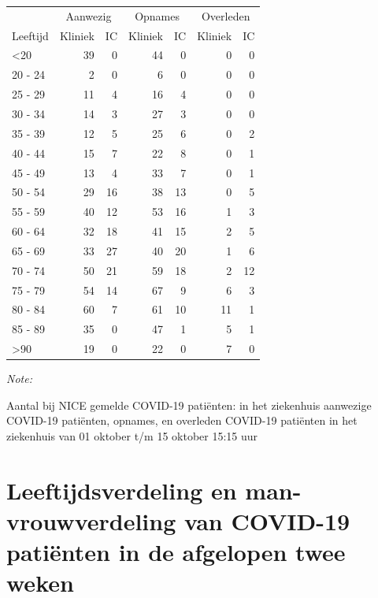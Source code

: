 \documentclass[
  english,
  man,floatsintext]{apa6}
\begin{document}
\begin{table}
\centering\begingroup\fontsize{10}{12}\selectfont

\begin{threeparttable}
\begin{tabular}{lrrrrrr}
\toprule
\multicolumn{1}{c}{ } & \multicolumn{2}{c}{Aanwezig} & \multicolumn{2}{c}{Opnames} & \multicolumn{2}{c}{Overleden} \\
\cmidrule(l{3pt}r{3pt}){2-3} \cmidrule(l{3pt}r{3pt}){4-5} \cmidrule(l{3pt}r{3pt}){6-7}
Leeftijd & Kliniek & IC & Kliniek & IC & Kliniek & IC\\
\midrule
<20 & 39 & 0 & 44 & 0 & 0 & 0\\
20 - 24 & 2 & 0 & 6 & 0 & 0 & 0\\
25 - 29 & 11 & 4 & 16 & 4 & 0 & 0\\
30 - 34 & 14 & 3 & 27 & 3 & 0 & 0\\
35 - 39 & 12 & 5 & 25 & 6 & 0 & 2\\
40 - 44 & 15 & 7 & 22 & 8 & 0 & 1\\
45 - 49 & 13 & 4 & 33 & 7 & 0 & 1\\
50 - 54 & 29 & 16 & 38 & 13 & 0 & 5\\
55 - 59 & 40 & 12 & 53 & 16 & 1 & 3\\
60 - 64 & 32 & 18 & 41 & 15 & 2 & 5\\
65 - 69 & 33 & 27 & 40 & 20 & 1 & 6\\
70 - 74 & 50 & 21 & 59 & 18 & 2 & 12\\
75 - 79 & 54 & 14 & 67 & 9 & 6 & 3\\
80 - 84 & 60 & 7 & 61 & 10 & 11 & 1\\
85 - 89 & 35 & 0 & 47 & 1 & 5 & 1\\
>90 & 19 & 0 & 22 & 0 & 7 & 0\\
\bottomrule
\end{tabular}
\begin{tablenotes}
\item \textit{Note: } 
\item Aantal bij NICE gemelde COVID-19 patiënten: in het ziekenhuis aanwezige COVID-19 patiënten, opnames, en overleden COVID-19 patiënten in het ziekenhuis van 01 oktober t/m 15 oktober 15:15 uur
\end{tablenotes}
\end{threeparttable}
\endgroup{}
\end{table}

\newpage

\hypertarget{leeftijdsverdeling-en-man-vrouwverdeling-van-covid-19-patiuxebnten-in-de-afgelopen-twee-weken}{%
\section{Leeftijdsverdeling en man-vrouwverdeling van COVID-19 patiënten in de afgelopen twee weken}\label{leeftijdsverdeling-en-man-vrouwverdeling-van-covid-19-patiuxebnten-in-de-afgelopen-twee-weken}}
\end{document}
